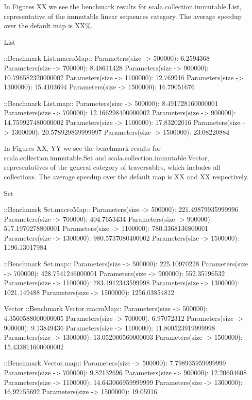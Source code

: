 In Figures XX we see the benchmark results for
scala.collection.immutable.List, representative of the immutable linear
sequences category. The average speedup over the default map is XX\%.

List

::Benchmark List.macroMap::
Parameters(size -> 500000): 6.2594368
Parameters(size -> 700000): 8.48611428
Parameters(size -> 900000): 10.796582320000002
Parameters(size -> 1100000): 12.769916
Parameters(size -> 1300000): 15.4103694
Parameters(size -> 1500000): 16.79051676

::Benchmark List.map::
Parameters(size -> 500000): 8.491728160000001
Parameters(size -> 700000): 12.166298400000002
Parameters(size -> 900000): 14.759927480000002
Parameters(size -> 1100000): 17.83202016
Parameters(size -> 1300000): 20.578929839999997
Parameters(size -> 1500000): 23.08220884


In Figures XX, YY we see the benchmark results for
scala.collection.immutable.Set and scala.collection.immutable.Vector,
representatives of the general category of traversables, which includes all
collections. The average speedup over the default map is XX and XX respectively.

Set

::Benchmark Set.macroMap::
Parameters(size -> 500000): 221.49879935999996
Parameters(size -> 700000): 404.7653434
Parameters(size -> 900000): 517.1970278800001
Parameters(size -> 1100000): 780.3368136800001
Parameters(size -> 1300000): 980.5737080400002
Parameters(size -> 1500000): 1196.13017984

::Benchmark Set.map::
Parameters(size -> 500000): 225.10970228
Parameters(size -> 700000): 428.7541246000001
Parameters(size -> 900000): 552.35796532
Parameters(size -> 1100000): 783.1912343599998
Parameters(size -> 1300000): 1021.149488
Parameters(size -> 1500000): 1256.03854812


Vector
::Benchmark Vector.macroMap::
Parameters(size -> 500000): 4.3560588000000005
Parameters(size -> 700000): 6.97072312
Parameters(size -> 900000): 9.13849436
Parameters(size -> 1100000): 11.800523919999998
Parameters(size -> 1300000): 13.052000560000003
Parameters(size -> 1500000): 15.433811600000002

::Benchmark Vector.map::
Parameters(size -> 500000): 7.798935959999999
Parameters(size -> 700000): 9.82132696
Parameters(size -> 900000): 12.20604608
Parameters(size -> 1100000): 14.643066959999999
Parameters(size -> 1300000): 16.92755692
Parameters(size -> 1500000): 19.05916


